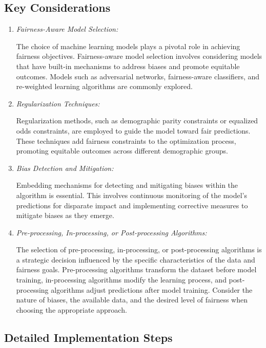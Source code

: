 \subsection{Key Considerations}

\begin{enumerate}

    \item \emph{Fairness-Aware Model Selection:} 
    
    The choice of machine learning models plays a pivotal role in achieving fairness objectives. Fairness-aware model selection involves considering models that have built-in mechanisms to address biases and promote equitable outcomes. Models such as adversarial networks, fairness-aware classifiers, and re-weighted learning algorithms are commonly explored.

    \item \emph{Regularization Techniques:} 
    
    Regularization methods, such as demographic parity constraints or equalized odds constraints, are employed to guide the model toward fair predictions. These techniques add fairness constraints to the optimization process, promoting equitable outcomes across different demographic groups.

    \item \emph{Bias Detection and Mitigation:} 
    
    Embedding mechanisms for detecting and mitigating biases within the algorithm is essential. This involves continuous monitoring of the model's predictions for disparate impact and implementing corrective measures to mitigate biases as they emerge.

    \item \emph{Pre-processing, In-processing, or Post-processing Algorithms:} 
    
    The selection of pre-processing, in-processing, or post-processing algorithms is a strategic decision influenced by the specific characteristics of the data and fairness goals. Pre-processing algorithms transform the dataset before model training, in-processing algorithms modify the learning process, and post-processing algorithms adjust predictions after model training. Consider the nature of biases, the available data, and the desired level of fairness when choosing the appropriate approach.

\end{enumerate}

\subsection{Detailed Implementation Steps}

